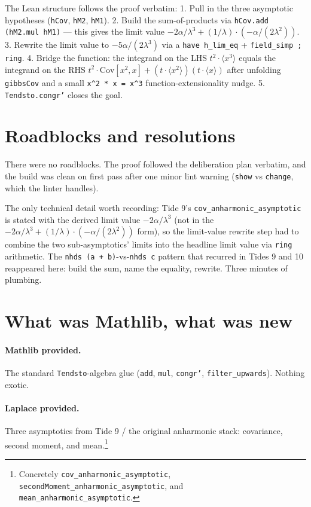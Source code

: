 \documentclass[11pt]{article}
\begin{document}
The Lean structure follows the proof verbatim:
1. Pull in the three asymptotic hypotheses
(\texttt{hCov}, \texttt{hM2}, \texttt{hM1}).
2. Build the sum-of-products via \texttt{hCov.add (hM2.mul hM1)} —
this gives the limit value
$-2\alpha/\lambda^3 + (1/\lambda) \cdot (-\alpha/(2\lambda^2))$.
3. Rewrite the limit value to $-5\alpha/(2\lambda^3)$ via a
\texttt{have h\_lim\_eq} + \texttt{field\_simp ; ring}.
4. Bridge the function: the integrand on the LHS
$t^2 \cdot \langle x^3 \rangle$ equals the integrand on the RHS
$t^2 \cdot \mathrm{Cov}[x^2, x] + (t \cdot \langle x^2 \rangle)(t \cdot \langle x \rangle)$
after unfolding \texttt{gibbsCov} and a small \texttt{x\^{}2 * x = x\^{}3}
function-extensionality nudge.
5. \texttt{Tendsto.congr'} closes the goal.

\section{Roadblocks and resolutions}

There were no roadblocks. The proof followed the deliberation plan
verbatim, and the build was clean on first pass after one minor lint
warning (\texttt{show} vs \texttt{change}, which the linter handles).

The only technical detail worth recording: Tide 9's
\texttt{cov\_anharmonic\_asymptotic} is stated with the derived limit
value $-2\alpha/\lambda^3$ (not in the
$-2\alpha/\lambda^3 + (1/\lambda)\cdot(-\alpha/(2\lambda^2))$ form),
so the limit-value rewrite step had to combine the two sub-asymptotics'
limits into the headline limit value via \texttt{ring} arithmetic. The
\texttt{nhds (a + b)}-vs-\texttt{nhds c} pattern that recurred in Tides 9
and 10 reappeared here: build the sum, name the equality, rewrite. Three
minutes of plumbing.

\section{What was Mathlib, what was new}

\paragraph{Mathlib provided.} The standard \texttt{Tendsto}-algebra
glue (\texttt{add}, \texttt{mul}, \texttt{congr'},
\texttt{filter\_upwards}). Nothing exotic.

\paragraph{Laplace provided.} Three asymptotics from Tide 9 / the
original anharmonic stack: covariance, second moment, and
mean.\footnote{Concretely
\texttt{cov\_anharmonic\_asymptotic},
\texttt{secondMoment\_anharmonic\_asymptotic}, and
\texttt{mean\_anharmonic\_asymptotic}.}
\end{document}
